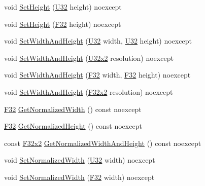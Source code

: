 \begin{DoxyCompactItemize}
\item 
void \hyperlink{classmage_1_1_viewport_abe55d91495584c60ff1bc91a7f286329}{Set\+Height} (\hyperlink{namespacemage_a41c104c036fba3756a74e19f793eeaa1}{U32} height) noexcept
\item 
void \hyperlink{classmage_1_1_viewport_a70a89b84a3dbe79475e10b4a61c0a34c}{Set\+Height} (\hyperlink{namespacemage_aa97e833b45f06d60a0a9c4fc22ae02c0}{F32} height) noexcept
\item 
void \hyperlink{classmage_1_1_viewport_ab3b8cdbc0b6b6e1c34bab0a4f05e0d52}{Set\+Width\+And\+Height} (\hyperlink{namespacemage_a41c104c036fba3756a74e19f793eeaa1}{U32} width, \hyperlink{namespacemage_a41c104c036fba3756a74e19f793eeaa1}{U32} height) noexcept
\item 
void \hyperlink{classmage_1_1_viewport_a8f9b769e134942c861618ed8e42f0817}{Set\+Width\+And\+Height} (\hyperlink{namespacemage_a88e05bff0300120c013285d3dcad95c5}{U32x2} resolution) noexcept
\item 
void \hyperlink{classmage_1_1_viewport_ab45df0ab7757f95d825fd724db663af5}{Set\+Width\+And\+Height} (\hyperlink{namespacemage_aa97e833b45f06d60a0a9c4fc22ae02c0}{F32} width, \hyperlink{namespacemage_aa97e833b45f06d60a0a9c4fc22ae02c0}{F32} height) noexcept
\item 
void \hyperlink{classmage_1_1_viewport_aac9ffe6dd252d6b0270f1c956e416ee7}{Set\+Width\+And\+Height} (\hyperlink{namespacemage_aa87237ad091f5cd7da612b8523fc108f}{F32x2} resolution) noexcept
\item 
\hyperlink{namespacemage_aa97e833b45f06d60a0a9c4fc22ae02c0}{F32} \hyperlink{classmage_1_1_viewport_a7a1bdfe9e46fbaa367551e5e04b3a0ff}{Get\+Normalized\+Width} () const noexcept
\item 
\hyperlink{namespacemage_aa97e833b45f06d60a0a9c4fc22ae02c0}{F32} \hyperlink{classmage_1_1_viewport_ad0319a3ff46d5939bf8a1d3f6a037e02}{Get\+Normalized\+Height} () const noexcept
\item 
const \hyperlink{namespacemage_aa87237ad091f5cd7da612b8523fc108f}{F32x2} \hyperlink{classmage_1_1_viewport_a9af5dc2aed1340dc59d012d6dd3f9429}{Get\+Normalized\+Width\+And\+Height} () const noexcept
\item 
void \hyperlink{classmage_1_1_viewport_a08bc363908ec49fd993950970a375c73}{Set\+Normalized\+Width} (\hyperlink{namespacemage_a41c104c036fba3756a74e19f793eeaa1}{U32} width) noexcept
\item 
void \hyperlink{classmage_1_1_viewport_af79a62d7996eb67cf9be99e3e7258f6a}{Set\+Normalized\+Width} (\hyperlink{namespacemage_aa97e833b45f06d60a0a9c4fc22ae02c0}{F32} width) noexcept

\end{DoxyCompactItemize}
